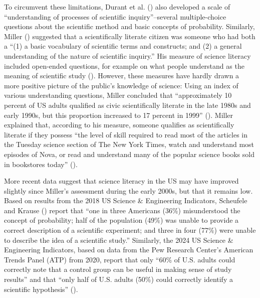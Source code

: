\documentclass[
  man,
  floatsintext,
  longtable,
  nolmodern,
  notxfonts,
  notimes,
  colorlinks=true,linkcolor=blue,citecolor=blue,urlcolor=blue]{apa7}
\begin{document}
To circumvent these limitations, Durant et al.
() also
developed a scale of ``understanding of processes of scientific
inquiry''--several multiple-choice questions about the scientific method
and basic concepts of probability. Similarly, Miller
()
suggested that a scientifically literate citizen was someone who had
both a ``(1) a basic vocabulary of scientific terms and constructs; and
(2) a general understanding of the nature of scientific inquiry.'' His
measure of science literacy included open-ended questions, for example
on what people understand as the meaning of scientific study
().
However, these measures have hardly drawn a more positive picture of the
public's knowledge of science: Using an index of various understanding
questions, Miller concluded that ``approximately 10 percent of US adults
qualified as civic scientifically literate in the late 1980s and early
1990s, but this proportion increased to 17 percent in 1999''
(). Miller explained that, according to his measure, someone
qualifies as scientifically literate if they possess ``the level of
skill required to read most of the articles in the Tuesday science
section of The New York Times, watch and understand most episodes of
Nova, or read and understand many of the popular science books sold in
bookstores today''
().

More recent data suggest that science literacy in the US may have
improved slightly since Miller's assessment during the early 2000s, but
that it remains low. Based on results from the 2018 US Science \&
Engineering Indicators, Scheufele and Krause
() report that ``one in three Americans (36\%) misunderstood the
concept of probability; half of the population (49\%) was unable to
provide a correct description of a scientific experiment; and three in
four (77\%) were unable to describe the idea of a scientific study.''
Similarly, the 2024 US Science \& Engineering Indicators, based on data
from the Pew Research Center's American Trends Panel (ATP) from 2020,
report that only ``60\% of U.S. adults could correctly note that a
control group can be useful in making sense of study results'' and that
``only half of U.S. adults (50\%) could correctly identify a scientific
hypothesis''
().
\end{document}
